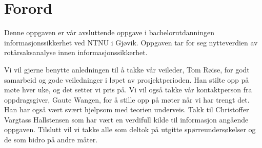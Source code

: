 \chapter*{Forord} %
\label{kap:forord}

Denne oppgaven er vår avsluttende oppgave i bachelorutdanningen informasjonssikkerhet ved NTNU i Gjøvik. Oppgaven tar for seg nytteverdien av rotårsaksanalyse innen informasjonssikkerhet. 

Vi vil gjerne benytte anledningen til å takke vår veileder, Tom Røise, for godt samarbeid og gode veiledninger i løpet av prosjektperioden. Han stilte opp på møte hver uke, og det setter vi pris på. Vi vil også takke vår kontaktperson fra oppdragsgiver, Gaute Wangen, for å stille opp på møter når vi har trengt det. Han har også vært svært hjelpsom med teorien underveis. Takk til Christoffer Vargtass Hallstensen som har vært en verdifull kilde til informasjon angående oppgaven. Tilslutt vil vi takke alle som deltok på utgitte spørreundersøkelser og de som bidro på andre måter. 